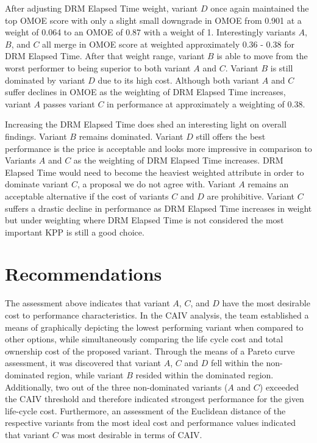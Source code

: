 \documentclass[letterpaper,10pt]{article}
\begin{document}
After adjusting DRM Elapsed Time weight, variant $D$ once again maintained the top OMOE score with only a slight small downgrade in OMOE from 0.901 at a weight of 0.064 to an OMOE of 0.87 with a weight of 1. Interestingly variants $A$, $B$, and $C$ all merge in OMOE score at weighted approximately 0.36 - 0.38 for DRM Elapsed Time.  After that weight range, variant $B$ is able to move from the worst performer to being superior to both variant $A$ and $C$. Variant $B$ is still dominated by variant $D$ due to its high cost. Although both variant $A$ and $C$ suffer declines in OMOE as the weighting of DRM Elapsed Time increases, variant $A$ passes variant $C$ in performance at approximately a weighting of 0.38.

Increasing the DRM Elapsed Time does shed an interesting light on overall findings.  Variant $B$ remains dominated. Variant $D$ still offers the best performance is the price is acceptable and looks more impressive in comparison to Variants $A$ and $C$ as the weighting of DRM Elapsed Time increases. DRM Elapsed Time would need to become the heaviest weighted attribute in order to dominate variant $C$, a proposal we do not agree with. Variant $A$ remains an acceptable alternative if the cost of variants $C$ and $D$ are prohibitive. Variant $C$ suffers a drastic decline in performance as DRM Elapsed Time increases in weight but under weighting where DRM Elapsed Time is not considered the most important KPP is still a good choice.

\section{Recommendations}
The assessment above indicates that variant $A$, $C$, and $D$ have the most desirable cost to performance characteristics. In the CAIV analysis, the team established a means of graphically depicting the lowest performing variant when compared to other options, while simultaneously comparing the life cycle cost and total ownership cost of the proposed variant. Through the means of a Pareto curve assessment, it was discovered that variant $A$, $C$ and $D$ fell within the non-dominated region, while variant $B$ resided within the dominated region. Additionally, two out of the three non-dominated variants ($A$ and $C$) exceeded the CAIV threshold and therefore indicated strongest performance for the given life-cycle cost. Furthermore, an assessment of the Euclidean distance of the respective variants from the most ideal cost and performance values indicated that variant $C$ was most desirable in terms of CAIV.
\end{document}
